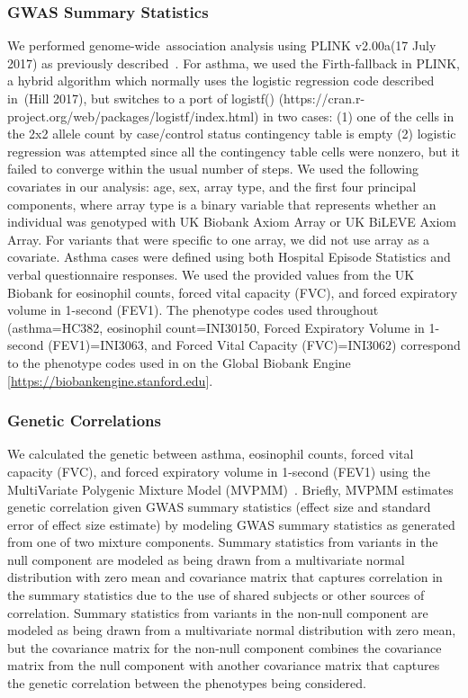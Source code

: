 \subsubsection*{GWAS Summary Statistics}
We performed genome-wide association analysis using PLINK v2.00a(17 July 2017) as previously described~\cite{DeBoever179762}. For asthma, we used the Firth-fallback in PLINK, a hybrid algorithm which normally uses the logistic regression code described in (Hill 2017), but switches to a port of logistf() (https://cran.r-project.org/web/packages/logistf/index.html) in two cases: (1) one of the cells in the 2x2 allele count by case/control status contingency table is empty (2) logistic regression was attempted since all the contingency table cells were nonzero, but it failed to converge within the usual number of steps. We used the following covariates in our analysis: age, sex, array type, and the first four principal components, where array type is a binary variable that represents whether an individual was genotyped with UK Biobank Axiom Array or UK BiLEVE Axiom Array. For variants that were specific to one array, we did not use array as a covariate. Asthma cases were defined using both Hospital Episode Statistics and verbal questionnaire responses. We used the provided values from the UK Biobank for eosinophil counts, forced vital capacity (FVC), and forced expiratory volume in 1-second (FEV1). The phenotype codes used throughout (asthma=HC382, eosinophil count=INI30150, Forced Expiratory Volume in 1-second (FEV1)=INI3063, and Forced Vital Capacity (FVC)=INI3062) correspond to the phenotype codes used in on the Global Biobank Engine [\url{https://biobankengine.stanford.edu}].

\subsubsection*{Genetic Correlations}
We calculated the genetic between asthma, eosinophil counts, forced vital capacity (FVC), and forced expiratory volume in 1-second (FEV1) using the MultiVariate Polygenic Mixture Model (MVPMM)~\cite{DeBoever2017}. Briefly, MVPMM estimates genetic correlation given GWAS summary statistics (effect size and standard error of effect size estimate) by modeling GWAS summary statistics as generated from one of two mixture components. Summary statistics from variants in the null component are modeled as being drawn from a multivariate normal distribution with zero mean and covariance matrix that captures correlation in the summary statistics due to the use of shared subjects or other sources of correlation. Summary statistics from variants in the non-null component are modeled as being drawn from a multivariate normal distribution with zero mean, but the covariance matrix for the non-null component combines the covariance matrix from the null component with another covariance matrix that captures the genetic correlation between the phenotypes being considered.

